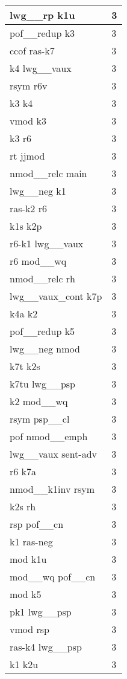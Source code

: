\documentclass[a4 paper]{article}
\begin{document}
\begin{longtable}{p{}p{}}
lwg\_\_rp k1u  & 3 \\ \midrule
pof\_\_redup k3  & 3 \\ \midrule
ccof ras-k7  & 3 \\ \midrule
k4 lwg\_\_vaux  & 3 \\ \midrule
rsym r6v  & 3 \\ \midrule
k3 k4  & 3 \\ \midrule
vmod k3  & 3 \\ \midrule
k3 r6  & 3 \\ \midrule
rt jjmod  & 3 \\ \midrule
nmod\_\_relc main  & 3 \\ \midrule
lwg\_\_neg k1  & 3 \\ \midrule
ras-k2 r6  & 3 \\ \midrule
k1s k2p  & 3 \\ \midrule
r6-k1 lwg\_\_vaux  & 3 \\ \midrule
r6 mod\_\_wq  & 3 \\ \midrule
nmod\_\_relc rh  & 3 \\ \midrule
lwg\_\_vaux\_cont k7p  & 3 \\ \midrule
k4a k2  & 3 \\ \midrule
pof\_\_redup k5  & 3 \\ \midrule
lwg\_\_neg nmod  & 3 \\ \midrule
k7t k2s  & 3 \\ \midrule
k7tu lwg\_\_psp  & 3 \\ \midrule
k2 mod\_\_wq  & 3 \\ \midrule
rsym psp\_\_cl  & 3 \\ \midrule
pof nmod\_\_emph  & 3 \\ \midrule
lwg\_\_vaux sent-adv  & 3 \\ \midrule
r6 k7a  & 3 \\ \midrule
nmod\_\_k1inv rsym  & 3 \\ \midrule
k2s rh  & 3 \\ \midrule
rsp pof\_\_cn  & 3 \\ \midrule
k1 ras-neg  & 3 \\ \midrule
mod k1u  & 3 \\ \midrule
mod\_\_wq pof\_\_cn  & 3 \\ \midrule
mod k5  & 3 \\ \midrule
pk1 lwg\_\_psp  & 3 \\ \midrule
vmod rsp  & 3 \\ \midrule
ras-k4 lwg\_\_psp  & 3 \\ \midrule
k1 k2u  & 3 \\ \midrule

\end{longtable}
\end{document}

